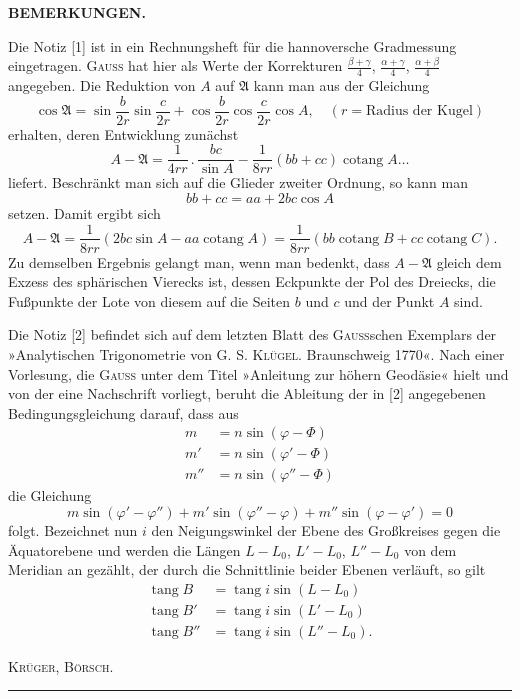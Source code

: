 \vspace*{.11\textheight}
{\small
\begin{center}\textbf{BEMERKUNGEN.}\end{center}

Die Notiz [1] ist in ein Rechnungsheft für die hannoversche Gradmessung eingetragen. \textsc{Gauss} hat
hier als Werte der Korrekturen \(\frac{\beta+\gamma}{4}\), \(\frac{\alpha+\gamma}{4}\), \(\frac{\alpha+\beta}{4}\) angegeben. Die Reduktion von \(A\) auf \(\mathfrak A\) kann man
aus der Gleichung
\[
\cos\mathfrak A=\sin\frac b{2r}\sin\frac c{2r}
+\cos\frac b{2r}\cos\frac c{2r}\cos A,\quad (r=\text{Radius der Kugel})
\]
\noindent erhalten, deren Entwicklung zunächst
\[
A-\mathfrak A=\frac1{4rr}\,.\,\frac{bc}{\sin A}
-\frac1{8rr}(bb+cc)\operatorname{cotang}A\ldots
\]
\noindent liefert. Beschränkt man sich auf die Glieder zweiter Ordnung, so kann man
\[
bb+cc=aa+2bc\cos A
\]
\noindent setzen. Damit ergibt sich
\[
A-\mathfrak A=\frac1{8rr}(2bc\sin A-aa\operatorname{cotang}A)
=\frac1{8rr}(bb\operatorname{cotang}B+cc\operatorname{cotang}C).
\]
\noindent Zu demselben Ergebnis gelangt man, wenn man bedenkt, dass \(A-\mathfrak A\) gleich dem Exzess des sphärischen
Vierecks ist, dessen Eckpunkte der Pol des Dreiecks, die Fußpunkte der Lote von diesem auf die Seiten
\(b\) und \(c\) und der Punkt \(A\) sind.

Die Notiz [2] befindet sich auf dem letzten Blatt des \textsc{Gauss}schen Exemplars der »Analytischen
Trigonometrie von G. S. \textsc{Klügel}. Braunschweig 1770«. Nach einer Vorlesung, die \textsc{Gauss}
unter dem Titel »Anleitung zur höhern Geodäsie« hielt und von der eine Nachschrift vorliegt, beruht die Ableitung
der in [2] angegebenen Bedingungsgleichung darauf, dass aus
\[
\begin{aligned}
m&=n\sin(\varphi-\Phi)\\
m'&=n\sin(\varphi'-\Phi)\\
m''&=n\sin(\varphi''-\Phi)
\end{aligned}
\]
\noindent die Gleichung
\[
m\sin(\varphi'-\varphi'')+m'\sin(\varphi''-\varphi)+m''\sin(\varphi-\varphi')=0
\]
\noindent folgt. Bezeichnet nun \(i\) den Neigungswinkel der Ebene des Großkreises gegen die Äquatorebene und
werden die Längen \(L-L_0\), \(L'-L_0\), \(L''-L_0\) von dem Meridian an gezählt, der durch die Schnittlinie beider Ebenen verläuft,
so gilt
\[
\begin{aligned}
\operatorname{tang}B&=\operatorname{tang}i\sin(L-L_0)\\
\operatorname{tang}B'&=\operatorname{tang}i\sin(L'-L_0)\\
\operatorname{tang}B''&=\operatorname{tang}i\sin(L''-L_0).
\end{aligned}
\]
\par\hfill\textsc{Krüger, Börsch.}\hspace{.06\textwidth}\par
}
\begin{center}\rule{.24\textwidth}{.4pt}\end{center}

